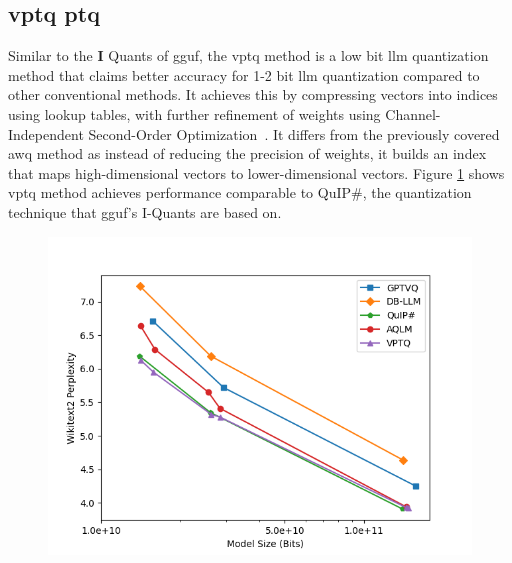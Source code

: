 \documentclass{ifacconf}
\begin{document}
	\subsection{\gls{vptq} \gls{ptq}}
	
	Similar to the \textbf{I} Quants of \gls{gguf}, the \gls{vptq} method is a low bit \gls{llm} quantization method that claims better accuracy for 1-2 bit \gls{llm} quantization compared to other conventional methods. It achieves this by compressing vectors into indices using lookup tables, with further refinement of weights using Channel-Independent Second-Order Optimization~\cite{liu2024vptqextremelowbitvector}. It differs from the previously covered \gls{awq} method as instead of reducing the precision of weights, it builds an index that maps high-dimensional vectors to lower-dimensional vectors. Figure \ref{fig:vptq} shows \gls{vptq} method achieves performance comparable to QuIP\#, the quantization technique that \gls{gguf}'s I-Quants are based on.
	
	\begin{figure}[h]
		\includegraphics[width=1.1\linewidth]{vptq}
		\label{fig:vptq}
	\end{figure}
	
\end{document}
